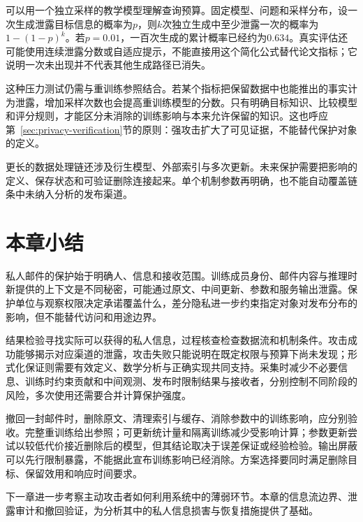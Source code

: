 可以用一个独立采样的教学模型理解查询预算。固定模型、问题和采样分布，设一次生成泄露目标信息的概率为$p$，则$k$次独立生成中至少泄露一次的概率为$1-(1-p)^k$。若$p=0.01$，一百次生成的累计概率已经约为$0.634$。真实评估还可能使用连续泄露分数或自适应提示，不能直接用这个简化公式替代论文指标；它说明一次未出现并不代表其他生成路径已消失。

这种压力测试仍需与重训练参照结合。若某个指标把保留数据中也能推出的事实计为泄露，增加采样次数也会提高重训练模型的分数。只有明确目标知识、比较模型和评分规则，才能区分未消除的训练影响与本来允许保留的知识。这也呼应第~\ref{sec:privacy-verification}节的原则：强攻击扩大了可见证据，不能替代保护对象的定义。

更长的数据处理链还涉及衍生模型、外部索引与多次更新。未来保护需要把影响的定义、保存状态和可验证删除连接起来。单个机制参数再明确，也不能自动覆盖链条中未纳入分析的发布渠道。

\section{本章小结}
\label{sec:privacy-summary}

私人邮件的保护始于明确人、信息和接收范围。训练成员身份、邮件内容与推理时新提供的上下文是不同秘密，可能通过原文、中间更新、参数和服务输出泄露。保护单位与观察权限决定承诺覆盖什么，差分隐私进一步约束指定对象对发布分布的影响，但不能替代访问和用途边界。

结果检验寻找实际可以获得的私人信息，过程核查检查数据流和机制条件。攻击成功能够揭示对应渠道的泄露，攻击失败只能说明在既定权限与预算下尚未发现；形式化保证则需要有效定义、数学分析与正确实现共同支持。采集时减少不必要信息、训练时约束贡献和中间观测、发布时限制结果与接收者，分别控制不同阶段的风险，多次使用还需要合并计算保护强度。

撤回一封邮件时，删除原文、清理索引与缓存、消除参数中的训练影响，应分别验收。完整重训练给出参照；可更新统计量和隔离训练减少受影响计算；参数更新尝试以较低代价接近删除后的模型，但其结论取决于误差保证或经验检验。输出屏蔽可以先行限制暴露，不能据此宣布训练影响已经消除。方案选择要同时满足删除目标、保留效用和响应时间要求。

下一章进一步考察主动攻击者如何利用系统中的薄弱环节。本章的信息流边界、泄露审计和撤回验证，为分析其中的私人信息损害与恢复措施提供了基础。
